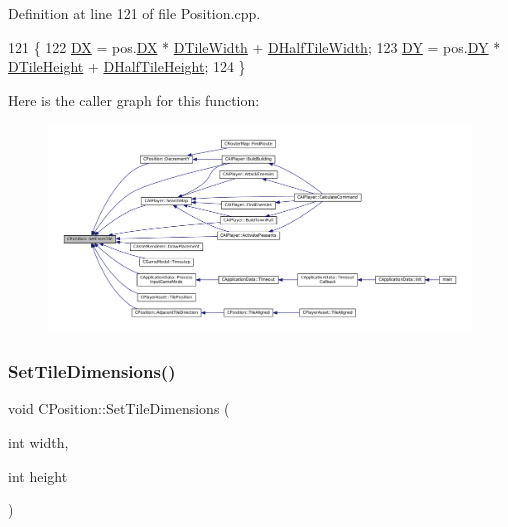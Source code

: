 Definition at line 121 of file Position.\+cpp.


\begin{DoxyCode}
121                                                \{
122     \hyperlink{classCPosition_a28445f9b872169715919074d82044eda}{DX} = pos.\hyperlink{classCPosition_a28445f9b872169715919074d82044eda}{DX} * \hyperlink{classCPosition_ac17d12fb5d35fcf62d63bb42e8cf7ed6}{DTileWidth} + \hyperlink{classCPosition_a3227e835d9008346e9d91bdad2380f14}{DHalfTileWidth};
123     \hyperlink{classCPosition_a84139c9e8eb547e7cf3cb851739943a4}{DY} = pos.\hyperlink{classCPosition_a84139c9e8eb547e7cf3cb851739943a4}{DY} * \hyperlink{classCPosition_a202ebb83e86df75cfb76cf1241ba817c}{DTileHeight} + \hyperlink{classCPosition_a1e0af68f7690b3cfc14687cf7fbe7ade}{DHalfTileHeight};
124 \}
\end{DoxyCode}
Here is the caller graph for this function\+:\nopagebreak
\begin{figure}[H]
\begin{center}
\leavevmode
\includegraphics[width=350pt]{classCPosition_a46994e6a8b8e3b4237edd7259ad844b6_icgraph}
\end{center}
\end{figure}
\hypertarget{classCPosition_a506e9efd21e209e36533ba7e594be75f}{}\label{classCPosition_a506e9efd21e209e36533ba7e594be75f} 
\subsubsection{\texorpdfstring{Set\+Tile\+Dimensions()}{SetTileDimensions()}}
{\footnotesize\ttfamily void C\+Position\+::\+Set\+Tile\+Dimensions (\begin{DoxyParamCaption}\item[{int}]{width,  }\item[{int}]{height }\end{DoxyParamCaption})\hspace{0.3cm}{\ttfamily [static]}}



